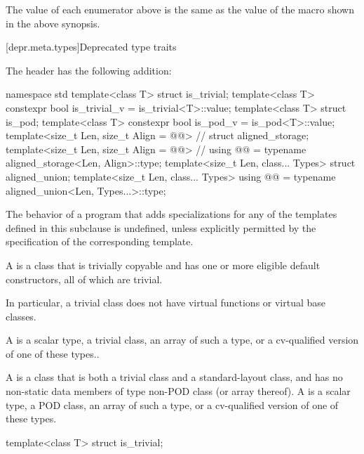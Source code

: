\pnum
The value of each  enumerator above
is the same as the value of the  macro
shown in the above synopsis.

[depr.meta.types]{Deprecated type traits}

\pnum
The header 
has the following addition:

\begin{codeblock}
namespace std {
  template<class T> struct is_trivial;
  template<class T> constexpr bool is_trivial_v = is_trivial<T>::value;
  template<class T> struct is_pod;
  template<class T> constexpr bool is_pod_v = is_pod<T>::value;
  template<size_t Len, size_t Align = @@> // \seebelow
    struct aligned_storage;
  template<size_t Len, size_t Align = @@> // \seebelow
    using @@ = typename aligned_storage<Len, Align>::type;
  template<size_t Len, class... Types>
    struct aligned_union;
  template<size_t Len, class... Types>
    using @@ = typename aligned_union<Len, Types...>::type;
}
\end{codeblock}

\pnum
The behavior of a program that adds specializations for
any of the templates defined in this subclause is undefined,
unless explicitly permitted by the specification of the corresponding template.

\pnum
\label{term.trivial.type}%
A  is a class that is trivially copyable and
has one or more eligible default constructors, all of which are trivial.
\begin{note}
In particular,
a trivial class does not have virtual functions or virtual base classes.
\end{note}
A  is a scalar type, a trivial class,
an array of such a type, or a cv-qualified version of one of these types..

\pnum
{}%
A  is a class that is both a trivial class and a
standard-layout class, and has no non-static data members of type non-POD class
(or array thereof). A  is a scalar type, a POD class, an array
of such a type, or a cv-qualified version of one of these types.

%
\begin{itemdecl}
template<class T> struct is_trivial;
\end{itemdecl}

